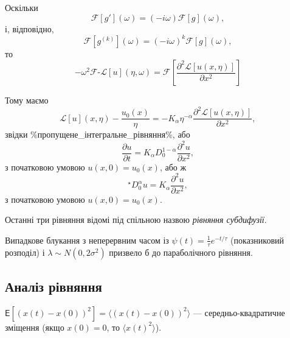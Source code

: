 Оскільки
\begin{equation}
    \mathcal{F}[g'](\omega) = (-i \omega) \mathcal{F}[g](\omega),
\end{equation}
і, відповідно,
\begin{equation}
    \mathcal{F}[g^{(k)}](\omega) = (-i \omega)^k \mathcal{F}[g](\omega),
\end{equation}
то
\begin{equation}
    - \omega^2 \mathcal{F}\text{-}\mathscr{L}[u](\eta,\omega) = \mathcal{F}\left[ \frac{\partial^2 \mathscr{L}[u(x,\eta)]}{\partial x^2} \right]
\end{equation}

Тому маємо
\begin{equation}
    \mathscr{L}[u](x,\eta) - \frac{u_0(x)}{\eta} = - K_\alpha \eta^{-\alpha} \frac{\partial^2 \mathscr{L}[u(x,\eta)]}{\partial x^2},
\end{equation}
звідки \%пропущене\_інтегральне\_рівняння\%, або
\begin{equation}
    \frac{\partial u}{\partial t} = K_\alpha D_0^{1 - \alpha} \frac{\partial^2 u}{\partial x^2},
\end{equation}
з початковою умовою $u(x, 0) = u_0(x)$, або ж
\begin{equation}
    {}^\star D_0^\alpha u = K_\alpha \frac{\partial^2 u}{\partial x^2},
\end{equation}
з початковою умовою $u(x, 0) = u_0(x)$.

\begin{definition}
    Останні три рівняння відомі під спільною назвою \textit{рівняння субдифузії}.
\end{definition}

\begin{remark}
    Випадкове блукання з неперервним часом із $\psi(t) = \frac{1}{\tau} e^{-t/\tau}$ (показниковий розподіл) і $\lambda \sim N(0, 2 \sigma^2)$ призвело б до параболічного рівняння.
\end{remark}

\subsection{Аналіз рівняння}

\begin{definition}
    $\mathsf{E}[(x(t) - x(0))^2] = \langle (x(t) - x(0))^2 \rangle$ --- середньо-квадратичне зміщення (якщо $x(0) = 0$, то $\langle x(t)^2 \rangle$).
\end{definition}

